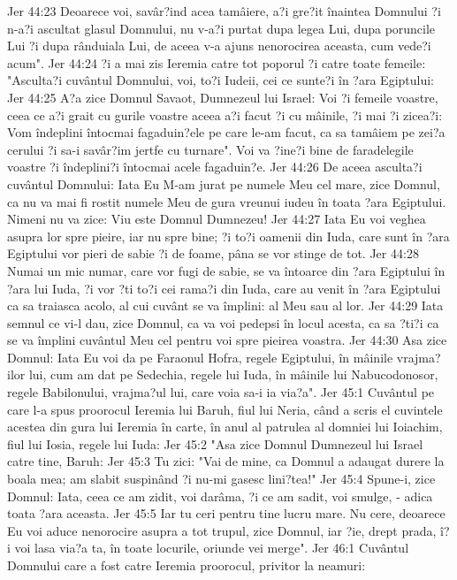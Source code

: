 Jer 44:23  Deoarece voi, savâr?ind acea tamâiere, a?i gre?it înaintea Domnului ?i n-a?i ascultat glasul Domnului, nu v-a?i purtat dupa legea Lui, dupa poruncile Lui ?i dupa rânduiala Lui, de aceea v-a ajuns nenorocirea aceasta, cum vede?i acum".
Jer 44:24  ?i a mai zis Ieremia catre tot poporul ?i catre toate femeile: "Asculta?i cuvântul Domnului, voi, to?i Iudeii, cei ce sunte?i în ?ara Egiptului:
Jer 44:25  A?a zice Domnul Savaot, Dumnezeul lui Israel: Voi ?i femeile voastre, ceea ce a?i grait cu gurile voastre aceea a?i facut ?i cu mâinile, ?i mai ?i zicea?i: Vom îndeplini întocmai fagaduin?ele pe care le-am facut, ca sa tamâiem pe zei?a cerului ?i sa-i savâr?im jertfe cu turnare". Voi va ?ine?i bine de faradelegile voastre ?i îndeplini?i întocmai acele fagaduin?e.
Jer 44:26  De aceea asculta?i cuvântul Domnului: Iata Eu M-am jurat pe numele Meu cel mare, zice Domnul, ca nu va mai fi rostit numele Meu de gura vreunui iudeu în toata ?ara Egiptului. Nimeni nu va zice: Viu este Domnul Dumnezeu!
Jer 44:27  Iata Eu voi veghea asupra lor spre pieire, iar nu spre bine; ?i to?i oamenii din Iuda, care sunt în ?ara Egiptului vor pieri de sabie ?i de foame, pâna se vor stinge de tot.
Jer 44:28  Numai un mic numar, care vor fugi de sabie, se va întoarce din ?ara Egiptului în ?ara lui Iuda, ?i vor ?ti to?i cei rama?i din Iuda, care au venit în ?ara Egiptului ca sa traiasca acolo, al cui cuvânt se va împlini: al Meu sau al lor.
Jer 44:29  Iata semnul ce vi-l dau, zice Domnul, ca va voi pedepsi în locul acesta, ca sa ?ti?i ca se va împlini cuvântul Meu cel pentru voi spre pieirea voastra.
Jer 44:30  Asa zice Domnul: Iata Eu voi da pe Faraonul Hofra, regele Egiptului, în mâinile vrajma?ilor lui, cum am dat pe Sedechia, regele lui Iuda, în mâinile lui Nabucodonosor, regele Babilonului, vrajma?ul lui, care voia sa-i ia via?a".
Jer 45:1  Cuvântul pe care l-a spus proorocul Ieremia lui Baruh, fiul lui Neria, când a scris el cuvintele acestea din gura lui Ieremia în carte, în anul al patrulea al domniei lui Ioiachim, fiul lui Iosia, regele lui Iuda:
Jer 45:2  "Asa zice Domnul Dumnezeul lui Israel catre tine, Baruh:
Jer 45:3  Tu zici: "Vai de mine, ca Domnul a adaugat durere la boala mea; am slabit suspinând ?i nu-mi gasesc lini?tea!"
Jer 45:4  Spune-i, zice Domnul: Iata, ceea ce am zidit, voi darâma, ?i ce am sadit, voi smulge, - adica toata ?ara aceasta.
Jer 45:5  Iar tu ceri pentru tine lucru mare. Nu cere, deoarece Eu voi aduce nenorocire asupra a tot trupul, zice Domnul, iar ?ie, drept prada, î?i voi lasa via?a ta, în toate locurile, oriunde vei merge".
Jer 46:1  Cuvântul Domnului care a fost catre Ieremia proorocul, privitor la neamuri:
